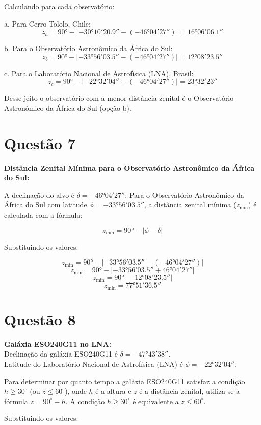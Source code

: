 \documentclass[a4paper, 12pt]{article}
\begin{document}
Calculando para cada observatório:

a. Para Cerro Tololo, Chile:
\[z_a = 90° - |-30°10'20.9'' - (-46°04'27'')| = 16°06'06.1''\]

b. Para o Observatório Astronômico da África do Sul:
\[z_b = 90° - |-33°56'03.5'' - (-46°04'27'')| = 12°08'23.5''\]

c. Para o Laboratório Nacional de Astrofísica (LNA), Brasil:
\[z_c = 90° - |-22°32'04'' - (-46°04'27'')| = 23°32'23''\]

Desse jeito o observatório com a menor distância zenital é o Observatório Astronômico da África do Sul (opção b).


\section*{Questão 7}

\textbf{Distância Zenital Mínima para o Observatório Astronômico da África do Sul:}

A declinação do alvo é \(\delta = -46°04'27''\). Para o Observatório Astronômico da África do Sul com latitude \(\phi = -33°56'03.5''\), a distância zenital mínima (\(z_{\text{min}}\)) é calculada com a fórmula:

\[
z_{\text{min}} = 90° - \left| \phi - \delta \right|
\]

Substituindo os valores:

\[
z_{\text{min}} = 90° - \left| -33°56'03.5'' - (-46°04'27'') \right|
\]
\[
z_{\text{min}} = 90° - \left| -33°56'03.5'' + 46°04'27'' \right|
\]
\[
z_{\text{min}} = 90° - \left| 12°08'23.5'' \right|
\]
\[
z_{\text{min}} = 77°51'36.5''
\]


\section*{Questão 8}
\textbf{Galáxia ESO240G11 no LNA:}
\\
Declinação da galáxia ESO240G11 é \(\delta = -47°43'38''\). \\ 
Latitude do Laboratório Nacional de Astrofísica (LNA) é \(\phi = -22°32'04''\).

Para determinar por quanto tempo a galáxia ESO240G11 satisfaz a condição \(h \geq 30^\circ\) (ou \(z \leq 60^\circ\)), onde \(h\) é a altura e \(z\) é a distância zenital, utiliza-se a fórmula \(z = 90^\circ - h\). A condição \(h \geq 30^\circ\) é equivalente a \(z \leq 60^\circ\).

Substituindo os valores:
\end{document}
